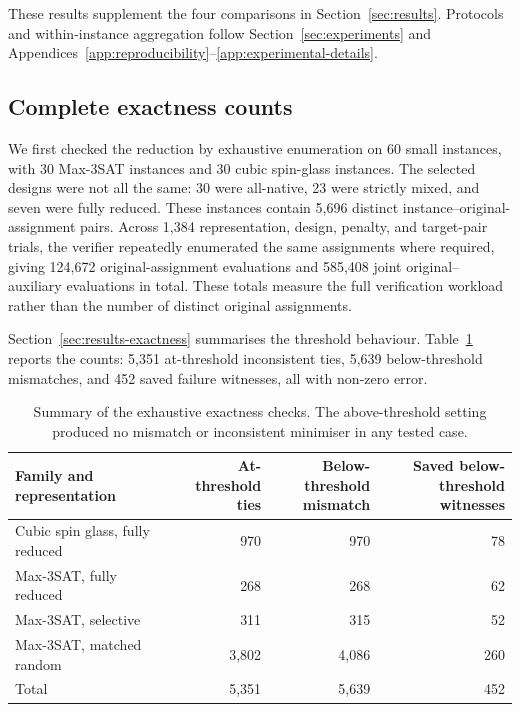 \documentclass[a4paper,onecolumn,11pt,unpublished]{quantumarticle}
\theoremstyle{remark}
\begin{document}
These results supplement the four comparisons in Section~\ref{sec:results}.
Protocols and within-instance aggregation follow Section~\ref{sec:experiments}
and Appendices~\ref{app:reproducibility}--\ref{app:experimental-details}.

\FloatBarrier
\subsection{Complete exactness counts}
\label{app:results-exactness}

We first checked the reduction by exhaustive enumeration on 60 small
instances, with 30 Max-3SAT instances and 30 cubic spin-glass instances.  The
selected designs were not all the same: 30 were all-native, 23 were strictly
mixed, and seven were fully reduced.  These instances contain 5,696 distinct
instance--original-assignment pairs.  Across 1,384 representation, design,
penalty, and target-pair trials, the verifier repeatedly enumerated the same
assignments where required, giving 124,672 original-assignment evaluations and
585,408 joint original--auxiliary evaluations in total.  These totals measure
the full verification workload rather than the number of distinct original
assignments.

Section~\ref{sec:results-exactness} summarises the threshold behaviour.
Table~\ref{tab:e1-exactness-summary} reports the counts:
5,351 at-threshold inconsistent ties, 5,639 below-threshold mismatches,
and 452 saved failure witnesses, all with non-zero error.

\begin{table}[!htbp]
    \centering
    \small
    \caption{Summary of the exhaustive exactness checks.  The
    above-threshold setting produced no mismatch or inconsistent minimiser in
    any tested case.}
    \label{tab:e1-exactness-summary}
    \begin{tabular}{@{}lrrr@{}}
        \toprule
        Family and representation
        & \shortstack{At-threshold\\ties}
        & \shortstack{Below-threshold\\mismatch}
        & \shortstack{Saved below-threshold\\witnesses}\\
        \midrule
        Cubic spin glass, fully reduced & 970 & 970 & 78\\
        Max-3SAT, fully reduced          & 268 & 268 & 62\\
        Max-3SAT, selective              & 311 & 315 & 52\\
        Max-3SAT, matched random         & 3,802 & 4,086 & 260\\
        \midrule
        Total                            & 5,351 & 5,639 & 452\\
        \bottomrule
    \end{tabular}
\end{table}
\end{document}
